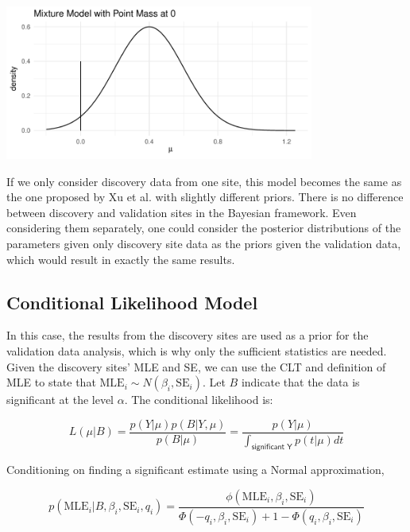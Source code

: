 \documentclass[AMA,STIX1COL]{WileyNJD-v2}\usepackage[]{graphicx}\usepackage[]{color}
\newenvironment{knitrout}{}{} %
\begin{document}
\begin{knitrout}
\color{fgcolor}

{\centering \includegraphics[width=4in]{figure/mixture-1} 

}



\end{knitrout}


If we only consider discovery data from one site, this model becomes the same as the one proposed by Xu et al. with slightly different priors. There is no difference between discovery and validation sites in the Bayesian framework. Even considering them separately, one could consider the posterior distributions of the parameters given only discovery site data as the priors given the validation data, which would result in exactly the same results. 

\subsection{Conditional Likelihood Model}

In this case, the results from the discovery sites are used as a prior for the validation data analysis, which is why only the sufficient statistics are needed. Given the discovery sites' MLE and SE, we can use the CLT and definition of MLE to state that $\text{MLE}_i \sim N(\beta_i, \text{SE}_i)$. Let $B$ indicate that the data is significant at the level $\alpha$. The conditional likelihood is:

\begin{equation}\label{eq4}
L(\mu | B) = \frac{p(Y| \mu)p(B| Y,\mu)}{p(B|\mu)} =  \frac{p(Y| \mu)}{\int_{\textsf{significant Y}} p(t| \mu) dt }
\end{equation}

Conditioning on finding a significant estimate using a Normal approximation, 

\begin{equation}\label{eq5}
p(\text{MLE}_i | B,\beta_i,\text{SE}_i,q_i) = \frac{\phi(\text{MLE}_i, \beta_i, \text{SE}_i)}{\Phi(-q_i, \beta_i, \text{SE}_i)+1-\Phi(q_i, \beta_i, \text{SE}_i)}
\end{equation}
\end{document}
